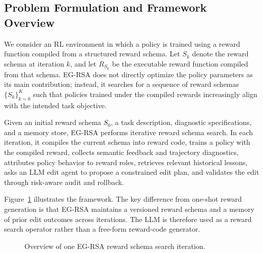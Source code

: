 \documentclass[11pt]{article}
\begin{document}
\subsection{Problem Formulation and Framework Overview}

We consider an RL environment in which a policy is trained using a reward function compiled from a structured reward schema. Let $S_k$ denote the reward schema at iteration $k$, and let $R_{S_k}$ be the executable reward function compiled from that schema. EG-RSA does not directly optimize the policy parameters as its main contribution; instead, it searches for a sequence of reward schemas $\{S_k\}_{k=0}^{K}$ such that policies trained under the compiled rewards increasingly align with the intended task objective.

Given an initial reward schema $S_0$, a task description, diagnostic specifications, and a memory store, EG-RSA performs iterative reward schema search. In each iteration, it compiles the current schema into reward code, trains a policy with the compiled reward, collects semantic feedback and trajectory diagnostics, attributes policy behavior to reward roles, retrieves relevant historical lessons, asks an LLM edit agent to propose a constrained edit plan, and validates the edit through risk-aware audit and rollback.

Figure~\ref{fig:loop} illustrates the framework. The key difference from one-shot reward generation is that EG-RSA maintains a versioned reward schema and a memory of prior edit outcomes across iterations. The LLM is therefore used as a reward search operator rather than a free-form reward-code generator.

\begin{figure}[t]
    \centering
    \caption{Overview of one EG-RSA reward schema search iteration.}
    \label{fig:loop}
\end{figure}
\end{document}
